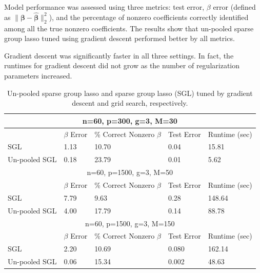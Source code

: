 \documentclass{statsoc}
\begin{document}
Model performance was assessed using three metrics: test error, $\beta$ error (defined as $\| \boldsymbol \beta - \hat {\boldsymbol \beta} \|_2 ^2$), and the percentage of nonzero coefficients correctly identified among all the true nonzero coefficients. The results show that un-pooled sparse group lasso tuned using gradient descent performed better by all metrics.

Gradient descent was significantly faster in all three settings. In fact, the runtimes for gradient descent did not grow as the number of regularization parameters increased.

\begin{table}
\caption{\label{table:unpooled} Un-pooled sparse group lasso and sparse group lasso (SGL) tuned by gradient descent and grid search, respectively.}
\centering
\begin{tabular}{| l | l | l | l | l | }
\hline
\multicolumn{5}{|c|}{n=60, p=300, g=3, M=30}\\
\hline
 & $\beta$ Error & \% Correct Nonzero $\beta$ & Test Error & Runtime (sec) \\
\hline
SGL & 1.13 & 10.70 & 0.04 & 15.81 \\
\hline
Un-pooled SGL & 0.18 & 23.79 & 0.01 & 5.62 \\
\hline
\multicolumn{5}{|c|}{n=60, p=1500, g=3, M=50}\\
\hline
 & $\beta$ Error & \% Correct Nonzero $\beta$ & Test Error & Runtime (sec) \\
\hline
SGL & 7.79 & 9.63 & 0.28 & 148.64 \\
\hline
Un-pooled SGL & 4.00 & 17.79 & 0.14 & 88.78 \\
\hline
\multicolumn{5}{|c|}{n=60, p=1500, g=3, M=150}\\
\hline
 & $\beta$ Error & \% Correct Nonzero $\beta$ & Test Error & Runtime (sec) \\
\hline
SGL & 2.20 & 10.69 & 0.080 & 162.14 \\
\hline
Un-pooled SGL & 0.06 & 15.34 & 0.002 & 48.63 \\
\hline
\end{tabular}
\end{table}
\end{document}
